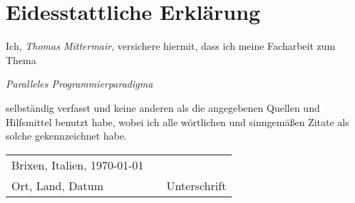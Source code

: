 
\chapter*{Eidesstattliche Erklärung} %
	
	\thispagestyle{empty}
	
	Ich, \textit{Thomas Mittermair}, versichere hiermit, dass ich meine Facharbeit zum Thema
	
	\begin{center}
		\textit{Paralleles Programmierparadigma}
	\end{center}
	
	selbständig verfasst und keine anderen als die angegebenen Quellen und Hilfsmittel benutzt habe, wobei ich alle wörtlichen und sinngemäßen Zitate als solche gekennzeichnet habe.

	\vspace{11cm}
	
	\begin{center}
		\begin{tabular}[h]{p{5cm}p{0.5cm}p{5cm}}
			Brixen, Italien, \today & & \\
			\cline{1-1}\cline{3-3}
			Ort, Land, Datum & & Unterschrift\\
		\end{tabular}
	\end{center}